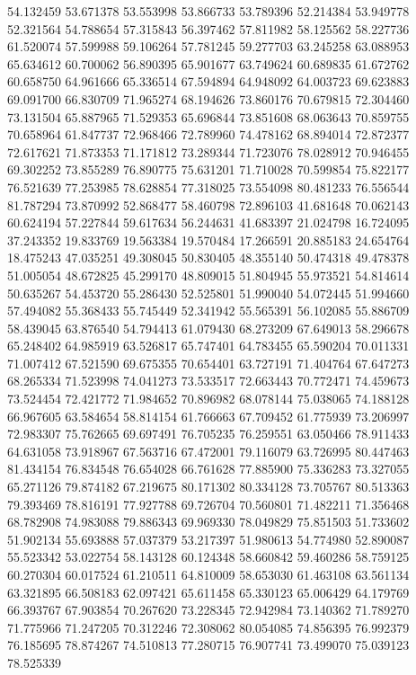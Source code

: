 54.132459
53.671378
53.553998
53.866733
53.789396
52.214384
53.949778
52.321564
54.788654
57.315843
56.397462
57.811982
58.125562
58.227736
61.520074
57.599988
59.106264
57.781245
59.277703
63.245258
63.088953
65.634612
60.700062
56.890395
65.901677
63.749624
60.689835
61.672762
60.658750
64.961666
65.336514
67.594894
64.948092
64.003723
69.623883
69.091700
66.830709
71.965274
68.194626
73.860176
70.679815
72.304460
73.131504
65.887965
71.529353
65.696844
73.851608
68.063643
70.859755
70.658964
61.847737
72.968466
72.789960
74.478162
68.894014
72.872377
72.617621
71.873353
71.171812
73.289344
71.723076
78.028912
70.946455
69.302252
73.855289
76.890775
75.631201
71.710028
70.599854
75.822177
76.521639
77.253985
78.628854
77.318025
73.554098
80.481233
76.556544
81.787294
73.870992
52.868477
58.460798
72.896103
41.681648
70.062143
60.624194
57.227844
59.617634
56.244631
41.683397
21.024798
16.724095
37.243352
19.833769
19.563384
19.570484
17.266591
20.885183
24.654764
18.475243
47.035251
49.308045
50.830405
48.355140
50.474318
49.478378
51.005054
48.672825
45.299170
48.809015
51.804945
55.973521
54.814614
50.635267
54.453720
55.286430
52.525801
51.990040
54.072445
51.994660
57.494082
55.368433
55.745449
52.341942
55.565391
56.102085
55.886709
58.439045
63.876540
54.794413
61.079430
68.273209
67.649013
58.296678
65.248402
64.985919
63.526817
65.747401
64.783455
65.590204
70.011331
71.007412
67.521590
69.675355
70.654401
63.727191
71.404764
67.647273
68.265334
71.523998
74.041273
73.533517
72.663443
70.772471
74.459673
73.524454
72.421772
71.984652
70.896982
68.078144
75.038065
74.188128
66.967605
63.584654
58.814154
61.766663
67.709452
61.775939
73.206997
72.983307
75.762665
69.697491
76.705235
76.259551
63.050466
78.911433
64.631058
73.918967
67.563716
67.472001
79.116079
63.726995
80.447463
81.434154
76.834548
76.654028
66.761628
77.885900
75.336283
73.327055
65.271126
79.874182
67.219675
80.171302
80.334128
73.705767
80.513363
79.393469
78.816191
77.927788
69.726704
70.560801
71.482211
71.356468
68.782908
74.983088
79.886343
69.969330
78.049829
75.851503
51.733602
51.902134
55.693888
57.037379
53.217397
51.980613
54.774980
52.890087
55.523342
53.022754
58.143128
60.124348
58.660842
59.460286
58.759125
60.270304
60.017524
61.210511
64.810009
58.653030
61.463108
63.561134
63.321895
66.508183
62.097421
65.611458
65.330123
65.006429
64.179769
66.393767
67.903854
70.267620
73.228345
72.942984
73.140362
71.789270
71.775966
71.247205
70.312246
72.308062
80.054085
74.856395
76.992379
76.185695
78.874267
74.510813
77.280715
76.907741
73.499070
75.039123
78.525339
